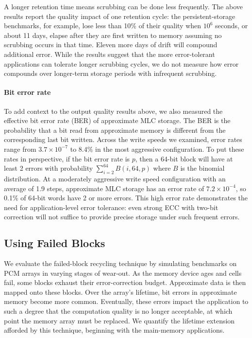 A longer retention time means scrubbing can be done less frequently.
The above results report the quality impact of one retention cycle:
the persistent-storage benchmarks, for example, lose less than 10\%
of their quality when $10^6$ seconds, or about 11 days, elapse after they are
first written to memory assuming no scrubbing occurs in that time.
Eleven more days of drift will compound additional error.
While the results suggest that the more error-tolerant applications can
tolerate longer scrubbing cycles, we do not measure how error compounds over
longer-term storage periods with infrequent scrubbing.

\paragraph{Bit error rate}

To add context to the output quality results above, we also measured the
effective bit error rate (BER) of approximate MLC storage. The BER is the
probability that a bit read from approximate memory is different from
the corresponding last bit written.
Across the write speeds we examined, error rates range from $3.7
\times 10^{-7}$ to $8.4\%$ in the most aggressive configuration.
%
To put these rates in perspective, if the bit error rate is $p$, then a 64-bit
block will have at least 2 errors with probability $\sum_{i = 2}^{64} B(i, 64,
p)$ where $B$ is the binomial distribution. At a moderately aggressive write
speed configuration with an average of 1.9 steps, approximate MLC storage has
an error rate of $7.2 \times 10^{-4}$, so 0.1\% of 64-bit
words have 2 or more errors. This high error rate demonstrates the need
for application-level error tolerance: even strong ECC with two-bit correction
will not suffice to provide precise storage under such frequent errors.


\subsection{Using Failed Blocks}

We evaluate the failed-block recycling technique by simulating
benchmarks on PCM arrays in varying stages of wear-out. As the
memory device ages and cells fail, some blocks exhaust their
error-correction budget. Approximate data is then mapped onto these
blocks.
Over the array's lifetime,
bit errors in approximate memory
become more common. Eventually, these errors impact the application to such a
degree that the computation quality is no longer acceptable, at which point the
memory array must be replaced.
We quantify the
lifetime extension afforded by this technique, beginning with the
main-memory applications.

